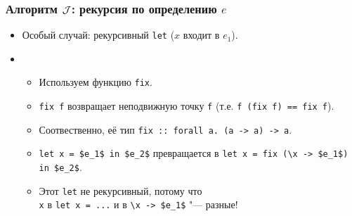 \documentclass[11pt]{beamer}
\begin{document}

\begin{frame}[fragile]
\frametitle{Алгоритм $\mathcal{J}$: рекурсия по определению $e$}
\begin{itemize}
    \item Особый случай: рекурсивный \lstinline|let| ($x$ входит в $e_1$).
    \pause
    \item[]
    \begin{itemize}
        \item Используем функцию \lstinline|fix|.
        \item \lstinline|fix f| возвращает неподвижную точку \lstinline|f| (т.е. \lstinline|f (fix f) == fix f|). 
        \pause
        \item Соотвественно, её тип \pause \lstinline|fix :: forall a. (a -> a) -> a|.
        \pause
        \item \lstinline[mathescape]|let x = $e_1$ in $e_2$| превращается в \lstinline[mathescape]|let x = fix (\x -> $e_1$) in $e_2$|.
        \item Этот \lstinline|let| не рекурсивный, потому что
        \pause 
        \\ \lstinline|x| в \lstinline|let x = ...| и в \lstinline[mathescape]|\x -> $e_1$| "--- разные!
    \end{itemize}
\end{itemize}
\end{frame}
\end{document}
